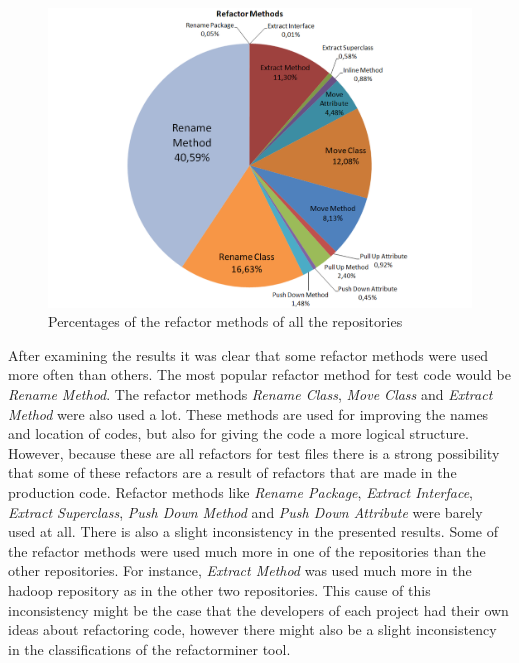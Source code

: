 \begin{figure}[!ht]
 \centering
 \includegraphics[width=\linewidth]{resources/refactorMethods.pdf}
 \caption{Percentages of the refactor methods of all the repositories}
 \label{figure:piechart}
\end{figure}


After examining the results it was clear that some refactor methods were used more often than others. The most popular refactor method for test code would be \textit{Rename Method}. The refactor methods \textit{Rename Class}, \textit{Move Class} and \textit{Extract Method} were also used a lot. These methods are used for improving the names and location of codes, but also for giving the code a more logical structure. However, because these are all refactors for test files there is a strong possibility that some of these refactors are a result of refactors that are made in the production code. Refactor methods like \textit{Rename Package}, \textit{Extract Interface}, \textit{Extract Superclass}, \textit{Push Down Method} and \textit{Push Down Attribute} were barely used at all. There is also a slight inconsistency in the presented results. Some of the refactor methods were used much more in one of the repositories than the other repositories. For instance, \textit{Extract Method} was used much more in the hadoop repository as in the other two repositories. This cause of this inconsistency might be the case that the developers of each project had their own ideas about refactoring code, however there might also be a slight inconsistency in the classifications of the refactorminer tool.

